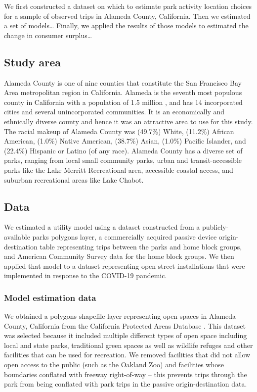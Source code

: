 \documentclass[3p, authoryear, review]{elsarticle} %
\begin{document}
We first constructed a dataset on which to estimate park activity location choices for a sample of observed trips in Alameda County, California. Then we estimated a set of models\ldots{} Finally, we applied the results of those models to estimated the change in consumer surplus\ldots{}

\hypertarget{study-area}{%
\subsection{Study area}\label{study-area}}

Alameda County is one of nine counties that constitute the San Francisco Bay Area metropolitan region in California. Alameda is the seventh most populous county in California with a population of 1.5 million \citep{alamedafacts}, and has 14 incorporated cities and several unincorporated communities. It is an economically and ethnically diverse county and hence it was an attractive area to use for this study. The racial makeup of Alameda County was (49.7\%) White, (11.2\%) African American, (1.0\%) Native American, (38.7\%) Asian, (1.0\%) Pacific Islander, and (22.4\%) Hispanic or Latino (of any race). Alameda County has a diverse set of parks, ranging from local small community parks, urban and transit-accessible parks like the Lake Merritt Recreational area, accessible coastal access, and suburban recreational areas like Lake Chabot.

\hypertarget{data}{%
\subsection{Data}\label{data}}

We estimated a utility model using a dataset constructed from a publicly-available parks polygons layer, a commercially acquired passive device origin-destination table representing trips between the parks and home block groups, and American Community Survey data for the home block groups. We then applied that model to a dataset representing open street installations that were implemented in response to the COVID-19 pandemic.

\hypertarget{model-estimation-data}{%
\subsubsection{Model estimation data}\label{model-estimation-data}}

We obtained a polygons shapefile layer representing open spaces in Alameda County, California from the California Protected Areas Database \citep{cpad2019}. This dataset was selected because it included multiple different types of open space including local and state parks, traditional green spaces as well as wildlife refuges and other facilities that can be used for recreation. We removed facilities that did not allow open access to the public (such as the Oakland Zoo) and facilities whose boundaries conflated with freeway right-of-way -- this prevents trips through the park from being conflated with park trips in the passive origin-destination data.
\end{document}
